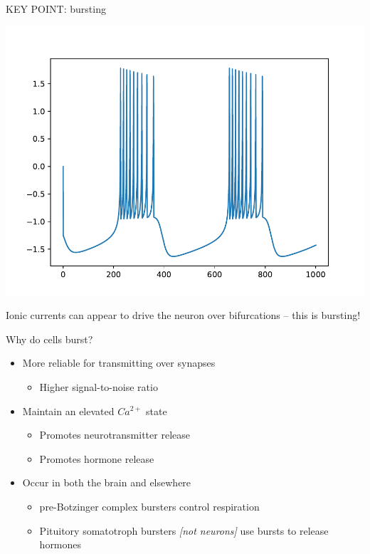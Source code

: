 \documentclass[presentation]{beamer}
\begin{document}
\begin{frame}[label={sec:org85dab1a}]{KEY POINT: bursting}
\begin{center}
\includegraphics[trim={0cm 0.75cm 0cm 1.25cm}, clip,height=.75\textheight]{./clean_HR.pdf}
\end{center}

Ionic currents can appear to drive the neuron over bifurcations -- this is bursting!
\end{frame}

\begin{frame}[label={sec:org32f4191}]{Why do cells burst?}
\begin{itemize}
\item More reliable for transmitting over synapses
\begin{itemize}
\item Higher signal-to-noise ratio
\end{itemize}
\end{itemize}
\vfill
\begin{itemize}
\item Maintain an elevated \(Ca^{2+}\) state
\begin{itemize}
\item Promotes neurotransmitter release
\item Promotes hormone release
\end{itemize}
\end{itemize}
\vfill
\begin{itemize}
\item Occur in both the brain and elsewhere
\begin{itemize}
\item pre-Botzinger complex bursters control respiration
\item Pituitory somatotroph bursters \emph{[not neurons]} use bursts to release hormones
\end{itemize}
\end{itemize}
\end{frame}
\end{document}
